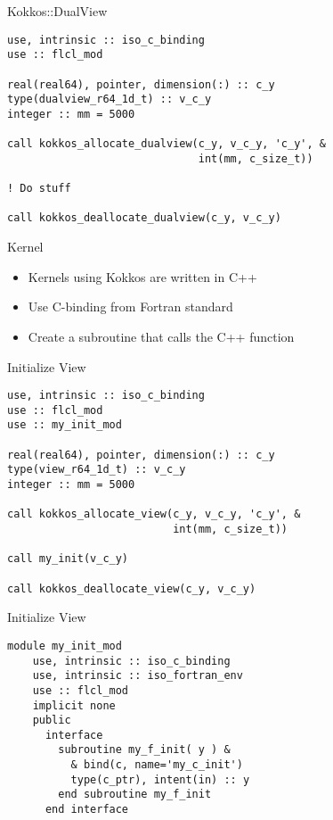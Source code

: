 \begin{frame}[containsverbatim]{Kokkos::DualView}
  \begin{verbatim}
use, intrinsic :: iso_c_binding
use :: flcl_mod

real(real64), pointer, dimension(:) :: c_y
type(dualview_r64_1d_t) :: v_c_y
integer :: mm = 5000

call kokkos_allocate_dualview(c_y, v_c_y, 'c_y', &
                              int(mm, c_size_t))

! Do stuff

call kokkos_deallocate_dualview(c_y, v_c_y)
  \end{verbatim}
\end{frame}

\begin{frame}{Kernel}
  \begin{itemize}
    \item Kernels using Kokkos are written in C++
    \item Use C-binding from Fortran standard 
    \item Create a subroutine that calls the C++ function
  \end{itemize}
\end{frame}

\begin{frame}[containsverbatim]{Initialize View}
  \begin{verbatim}
use, intrinsic :: iso_c_binding
use :: flcl_mod
use :: my_init_mod

real(real64), pointer, dimension(:) :: c_y
type(view_r64_1d_t) :: v_c_y
integer :: mm = 5000

call kokkos_allocate_view(c_y, v_c_y, 'c_y', &
                          int(mm, c_size_t))

call my_init(v_c_y)

call kokkos_deallocate_view(c_y, v_c_y)
  \end{verbatim}
\end{frame}

\begin{frame}[containsverbatim]{Initialize View}
  \begin{verbatim}
module my_init_mod
    use, intrinsic :: iso_c_binding
    use, intrinsic :: iso_fortran_env
    use :: flcl_mod
    implicit none
    public
      interface
        subroutine my_f_init( y ) &
          & bind(c, name='my_c_init')
          type(c_ptr), intent(in) :: y
        end subroutine my_f_init
      end interface
  \end{verbatim}
\end{frame}

